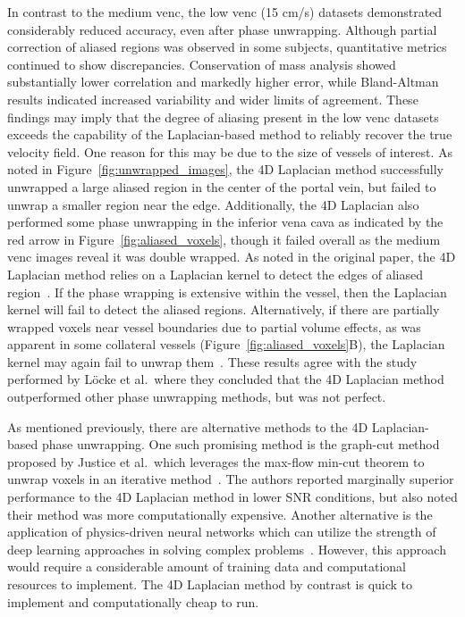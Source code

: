 In contrast to the medium venc, the low venc (15 cm/s) datasets demonstrated considerably reduced accuracy, even after phase unwrapping. Although partial correction of aliased regions was observed in some subjects, quantitative metrics continued to show discrepancies. Conservation of mass analysis showed substantially lower correlation and markedly higher error, while Bland-Altman results indicated increased variability and wider limits of agreement. These findings may imply that the degree of aliasing present in the low venc datasets exceeds the capability of the Laplacian-based method to reliably recover the true velocity field. One reason for this may be due to the size of vessels of interest. As noted in Figure~\ref{fig:unwrapped_images}, the 4D Laplacian method successfully unwrapped a large aliased region in the center of the portal vein, but failed to unwrap a smaller region near the edge. Additionally, the 4D Laplacian also performed some phase unwrapping in the inferior vena cava as indicated by the red arrow in Figure~\ref{fig:aliased_voxels}, though it failed overall as the medium venc images reveal it was double wrapped. As noted in the original paper, the 4D Laplacian method relies on a Laplacian kernel to detect the edges of aliased region~\cite{loecherPhaseUnwrapping4D2016}. If the phase wrapping is extensive within the vessel, then the Laplacian kernel will fail to detect the aliased regions. Alternatively, if there are partially wrapped voxels near vessel boundaries due to partial volume effects, as was apparent in some collateral vessels (Figure~\ref{fig:aliased_voxels}B), the Laplacian kernel may again fail to unwrap them~\cite{loecherPhaseUnwrapping4D2016}. These results agree with the study performed by L\"{o}cke et al.\ where they concluded that the 4D Laplacian method outperformed other phase unwrapping methods, but was not perfect.

As mentioned previously, there are alternative methods to the 4D Laplacian-based phase unwrapping. One such promising method is the graph-cut method proposed by Justice et al.\ which leverages the max-flow min-cut theorem to unwrap voxels in an iterative method~\cite{justicePhaseUnwrapping4Dflow2018}. The authors reported marginally superior performance to the 4D Laplacian method in lower SNR conditions, but also noted their method was more computationally expensive. Another alternative is the application of physics-driven neural networks which can utilize the strength of deep learning approaches in solving complex problems~\cite{zhangDivergenceFreeConstrainedPhase2021, renUnsupervisedPhaseUnwrapping2025}. However, this approach would require a considerable amount of training data and computational resources to implement. The 4D Laplacian method by contrast is quick to implement and computationally cheap to run.

